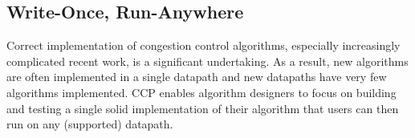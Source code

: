 
 
\subsection{Write-Once, Run-Anywhere}
\label{s:capabilities:wora}
\label{s:datapaths:eval}

Correct implementation of congestion control algorithms, especially increasingly complicated recent work, is a significant undertaking.
As a result, new algorithms are often implemented in a single datapath and new datapaths have very few algorithms implemented. 
CCP enables algorithm designers to focus on building and testing a single solid implementation of their algorithm that users can then run on any (supported) datapath. 

